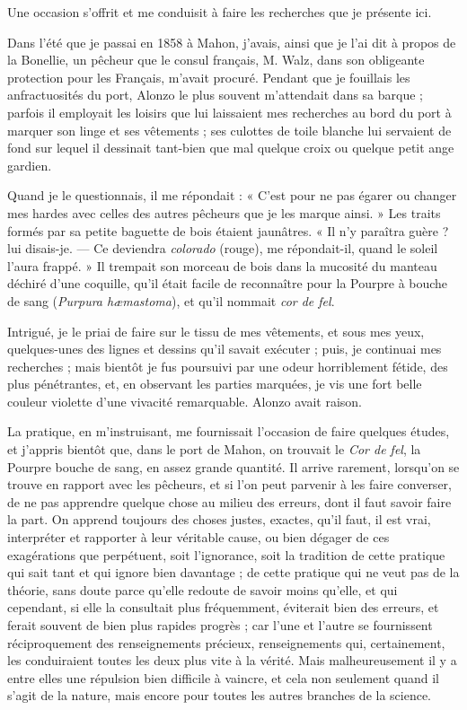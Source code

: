 \documentclass[a4paper, 11pt, oneside, polutonikogreek, french]{article}
\begin{document}
Une occasion s'offrit et me conduisit à faire les recherches que je présente ici.

Dans l'été que je passai en 1858 à Mahon, j'avais, ainsi que je l'ai dit à propos de la Bonellie, un pêcheur que le consul français, M. Walz, dans son obligeante protection pour les Français, m'avait procuré. Pendant que je fouillais les anfractuosités du port, Alonzo le plus souvent m'attendait dans sa barque ; parfois il employait les loisirs que lui laissaient mes recherches au bord du port à marquer son linge et ses vêtements ; ses culottes de toile blanche lui servaient de fond sur lequel il dessinait tant-bien que mal quelque croix ou quelque petit ange gardien.

Quand je le questionnais, il me répondait : « C'est pour ne pas égarer ou changer mes hardes avec celles des autres pêcheurs que je les marque ainsi. » Les traits formés par sa petite baguette de bois étaient jaunâtres. « Il n'y paraîtra guère ? lui disais-je. --- Ce deviendra \emph{colorado} (rouge), me répondait-il, quand le soleil l'aura frappé. » Il trempait son morceau de bois dans la mucosité du manteau déchiré d'une coquille, qu'il était facile de reconnaître pour la Pourpre à bouche de sang (\emph{Purpura hæmastoma}), et qu'il nommait \emph{cor de fel}.

Intrigué, je le priai de faire sur le tissu de mes vêtements, et sous mes yeux, quelques-unes des lignes et dessins qu'il savait exécuter ; puis, je continuai mes recherches ; mais bientôt je fus poursuivi par une odeur horriblement fétide, des plus pénétrantes, et, en observant les parties marquées, je vis une fort belle couleur violette d'une vivacité remarquable. Alonzo avait raison.

La pratique, en m'instruisant, me fournissait l'occasion de faire quelques études, et j'appris bientôt que, dans le port de Mahon, on trouvait le \emph{Cor de fel}, la Pourpre bouche de sang, en assez grande quantité. Il arrive rarement, lorsqu'on se trouve en rapport avec les pêcheurs, et si l'on peut parvenir à les faire converser, de ne pas apprendre quelque chose au milieu des erreurs, dont il faut savoir faire la part. On apprend toujours des choses justes, exactes, qu'il faut, il est vrai, interpréter et rapporter à leur véritable cause, ou bien dégager de ces exagérations que perpétuent, soit l'ignorance, soit la tradition de cette pratique qui sait tant et qui ignore bien davantage ; de cette pratique qui ne veut pas de la théorie, sans doute parce qu'elle redoute de savoir moins qu'elle, et qui cependant, si elle la consultait plus fréquemment, éviterait bien des erreurs, et ferait souvent de bien plus rapides progrès ; car l'une et l'autre se fournissent réciproquement des renseignements précieux, renseignements qui, certainement, les conduiraient toutes les deux plus vite à la vérité. Mais malheureusement il y a entre elles une répulsion bien difficile à vaincre, et cela non seulement quand il s'agit de la nature, mais encore pour toutes les autres branches de la science.
\end{document}
